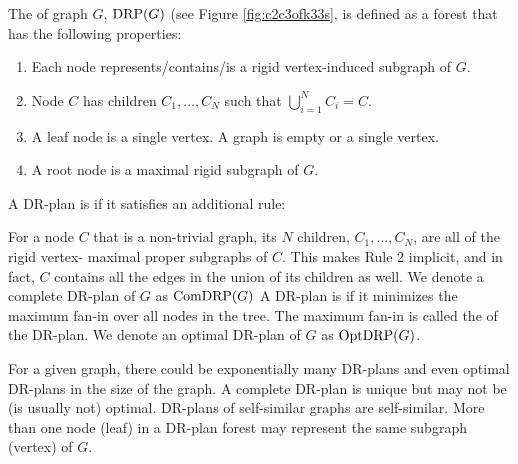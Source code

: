 %
\begin{definition}\label{def:drp}
    The  of graph
    $G$, \cite{hoffman2001decompositionI} $\text{DRP}(G)$ (see Figure \ref{fig:c2c3ofk33s}, is defined as a forest that has the
    following properties:
    \begin{enumerate}
        \item Each node represents/contains/is a rigid vertex-induced
        subgraph of $G$.
        \item Node $C$ has children $C_1,\ldots,C_N$ such that $\bigcup_{i=1}^N{C_i}=C$.
        \item A leaf node is a single vertex.
A  graph is empty or a single vertex.
        \item A root node is a maximal rigid subgraph of $G$.
    \end{enumerate}
%
%
    A DR-plan is  if it satisfies an additional rule:
        \item For a node $C$ that is  a non-trivial graph, its $N$
        children, $C_1, \ldots, C_N$, are all of the rigid vertex-
        maximal proper subgraphs of $C$. This makes Rule 2 implicit,
        and in fact, $C$ contains all the edges in the union of its
        children as well.
        We denote a complete DR-plan of $G$ as $\text{ComDRP}(G)$
    A DR-plan is  if it minimizes the maximum fan-in over all nodes in the tree.
    The maximum  fan-in is called the  of the DR-plan.
    We denote an optimal DR-plan of $G$ as $\text{OptDRP}(G)$.

%
\end{definition}
%
\begin{remark}
    For a given graph, there could be exponentially many  DR-plans and
    even optimal DR-plans in the size of the graph. A complete DR-plan
    is unique but may not be (is usually not) optimal. DR-plans
    of self-similar graphs are self-similar. More than one node (leaf)
    in a DR-plan forest may represent the same subgraph (vertex) of
    $G$.
\end{remark}

